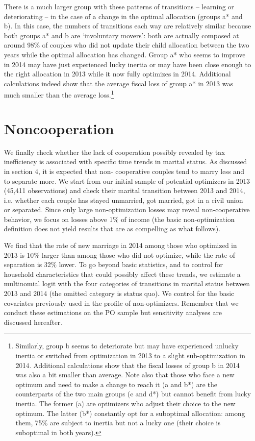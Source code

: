 \medskip
There is a much larger group with these patterns of transitions – learning or deteriorating – in the case of a change in the optimal allocation (groups a* and b). In this case, the numbers of transitions each way are relatively similar because both groups a* and b are `involuntary movers’: both are actually composed at around 98\% of couples who did not update their child allocation between the two years while the optimal allocation has changed. Group a* who seems to improve in 2014 may have just experienced lucky inertia or may have been close enough to the right allocation in 2013 while it now fully optimizes in 2014. Additional calculations indeed show that the average fiscal loss of group a* in 2013 was much smaller than the average loss.\footnote{Similarly, group b seems to deteriorate but may have experienced unlucky inertia or switched from optimization in 2013 to a slight sub-optimization in 2014. Additional calculations show that the fiscal losses of group b in 2014 was also a bit smaller than average. Note also that those who face a new optimum and need to make a change to reach it (a and b*) are the counterparts of the two main groups (c and d*) but cannot benefit from lucky inertia. The former (a) are optimizers who adjust their choice to the new optimum. The latter (b*) constantly opt for a suboptimal allocation: among them, 75\% are subject to inertia but not a lucky one (their choice is suboptimal in both years).}

\section{Noncooperation}

We finally check whether the lack of cooperation possibly revealed by tax inefficiency is associated with specific time trends in marital status. As discussed in section 4, it is expected that non- cooperative couples tend to marry less and to separate more. We start from our initial sample of potential optimizers in 2013 (45,411 observations) and check their marital transition between 2013 and 2014, i.e. whether each couple has stayed unmarried, got married, got in a civil union or separated. Since only large non-optimization losses may reveal non-cooperative behavior, we focus on losses above 1\% of income (the basic non-optimization definition does not yield results that are as compelling as what follows).


\medskip
We find that the rate of new marriage in 2014 among those who optimized in 2013 is 10\% larger than among those who did not optimize, while the rate of separation is 32\% lower. To go beyond basic statistics, and to control for household characteristics that could possibly affect these trends, we estimate a multinomial logit with the four categories of transitions in marital status between 2013 and 2014 (the omitted category is status quo). We control for the basic covariates previously used in the profile of non-optimizers. Remember that we conduct these estimations on the PO sample but sensitivity analyses are discussed hereafter.


